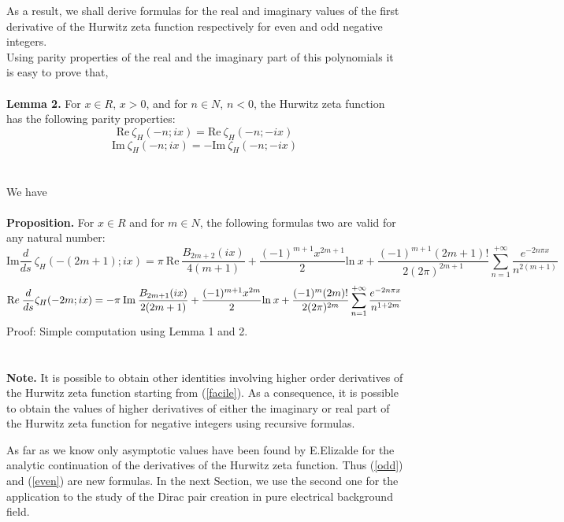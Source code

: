 \documentclass [11pt]{article}
\begin{document}
As a result,  we shall derive formulas for the real and imaginary values of 
the first derivative of the Hurwitz zeta 
function respectively for even and odd 
negative integers.\\
Using parity properties of the real and the imaginary part of this polynomials it is easy to prove that,  \\
\\
{\bf Lemma 2.}
For $x\in R$, $x>0$, and for $n\in N$, $n<0$, the Hurwitz zeta function has the following parity properties:
\begin{equation}
\mbox{Re} \: \zeta_H(-n;ix) = \mbox{Re} \:\zeta_H(-n;-ix)
\end{equation}
\begin{equation}
\mbox{Im} \: \zeta_H(-n;ix) = -\mbox{Im} \:\zeta_H(-n;-ix)
 \end{equation} 
 \\
 \\
We have
\\
\\
 {\bf Proposition.}
  For $x\in R$ and for $m\in N$, the following formulas two are valid for any natural number:
  \begin{equation}
  \label{odd}
 \mbox {Im} \frac{d}{ds} \: \zeta_H(-(2m+1);ix)=\pi\: \mbox{Re}\: \frac{{B_{2m+2}(ix)}}{4(m+1)}+\frac{(-1)^{m+1}x^{2m+1}}{2}\mbox{ln} \:x
 +\frac{(-1)^{m+1}(2m+1)!}{2(2\pi)^{2m+1}}\sum_{n=1}^{+\infty}\frac{e^{-2n\pi{x}}}{n^{2(m+1)}}
\end{equation}
\begin{equation}
\label{even}
 \mbox Re\: \frac{d}{ds}\zeta_H(-2m;ix)=-\pi\: \mbox{Im}\: \frac{{B_{2m+1}(ix)}}{2(2m+1)}+\frac{(-1)^{m+1}x^{2m}}{2}\mbox{ln} \:x
 +\frac{(-1)^{m}(2m)!}{2(2\pi)^{2m}}\sum_{n=1}^{+\infty}\frac{e^{-2n\pi{x}}}{n^{1+2m}}
 \end{equation}
 Proof: Simple computation using Lemma 1 and 2.\\
 \\
\\
{\bf Note.}
It is possible to obtain other identities involving higher order derivatives 
 of the Hurwitz zeta function starting from (\ref {facile}).
As a consequence, it is possible to obtain the values
of higher derivatives of either the imaginary or real part of the Hurwitz zeta 
function for negative integers using recursive formulas.

As far as we know only asymptotic values have been found by E.Elizalde
\cite{Elizalde:1993zg,19} for the analytic continuation of the 
 derivatives of the Hurwitz zeta function. Thus (\ref{odd}) and (\ref{even}) 
are new formulas. In the next Section, we use the second one for the application to 
the study of the Dirac pair creation in pure electrical background field.
\\
\\
\end{document}
